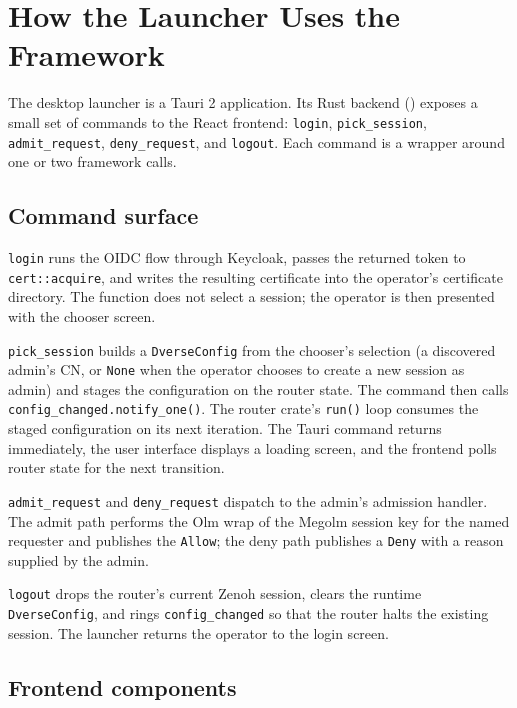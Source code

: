 \documentclass[11pt,a4paper]{article}
\begin{document}
\section{How the Launcher Uses the Framework}

The desktop launcher is a Tauri 2 application. Its Rust backend
() exposes a small set
of commands to the React frontend: \texttt{login},
\texttt{pick\_session}, \texttt{admit\_request},
\texttt{deny\_request}, and \texttt{logout}. Each command is a
wrapper around one or two framework calls.

\subsection{Command surface}

\texttt{login} runs the OIDC flow through Keycloak, passes the
returned token to \texttt{cert::acquire}, and writes the resulting
certificate into the operator's certificate directory. The
function does not select a session; the operator is then
presented with the chooser screen.

\texttt{pick\_session} builds a \texttt{DverseConfig} from the
chooser's selection (a discovered admin's CN, or \texttt{None}
when the operator chooses to create a new session as admin) and
stages the configuration on the router state. The command then
calls \texttt{config\_changed.notify\_one()}. The router crate's
\texttt{run()} loop consumes the staged configuration on its next
iteration. The Tauri command returns immediately, the user
interface displays a loading screen, and the frontend polls
router state for the next transition.

\texttt{admit\_request} and \texttt{deny\_request} dispatch to
the admin's admission handler. The admit path performs the Olm
wrap of the Megolm session key for the named requester and
publishes the \texttt{Allow}; the deny path publishes a
\texttt{Deny} with a reason supplied by the admin.

\texttt{logout} drops the router's current Zenoh session, clears
the runtime \texttt{DverseConfig}, and rings
\texttt{config\_changed} so that the router halts the existing
session. The launcher returns the operator to the login screen.

\subsection{Frontend components}
\end{document}

